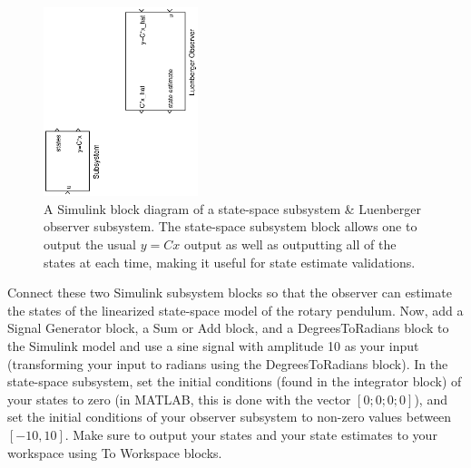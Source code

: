 \documentclass[12pt]{report}
\begin{document}
\begin{figure}[htb!]
    \centering
    \includegraphics[width=0.4\textwidth,angle=-90]{eps/lab_3/luenberger_openloop_student}
    \caption{A Simulink block diagram of a state-space subsystem \& Luenberger observer subsystem. The state-space subsystem block allows one to output the usual $y=Cx$ output as well as outputting all of the states at each time, making it useful for state estimate validations.}
    \label{figure:lab3_statespace_block}
\end{figure}

Connect these two Simulink subsystem blocks so that the observer can estimate the states of the linearized state-space model of the rotary pendulum. Now, add a Signal Generator block, a Sum or Add block, and a DegreesToRadians block to the Simulink model and use a sine signal with amplitude 10 as your input (transforming your input to radians using the DegreesToRadians block). In the state-space subsystem, set the initial conditions (found in the integrator block) of your states to zero (in MATLAB, this is done with the vector $[0;0;0;0]$), and set the initial conditions of your observer subsystem to non-zero values between $[-10,10]$. Make sure to output your states and your state estimates to your workspace using To Workspace blocks.
\end{document}
